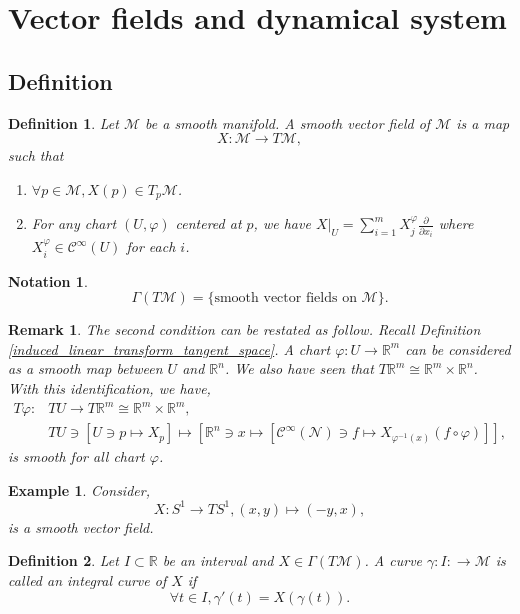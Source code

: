 \documentclass[8pt]{article}
\newtheorem{definition}{Definition}[section]
\newtheorem{notation}{Notation}[section]
\newtheorem{remark}{Remark}[section]
\newtheorem{example}{Example}[section]
\newcommand{\R}[0]{\mathbb{R}}
\newcommand{\M}[0]{\mathcal{M}}
\newcommand{\maniN}[0]{\mathcal{N}}
\newcommand{\cinf}[0]{\mathcal{C}^\infty}
\newcommand{\pd}[2]{{\frac {\partial #1} {\partial #2}}}
\begin{document}
\section{Vector fields and dynamical system}
\subsection{Definition}
\begin{definition}
  Let $\M$ be a smooth manifold. A smooth vector field of $\M$ is a map 
  \begin{equation*}
    X:\M\to T\M,
  \end{equation*}
  such that 
  \begin{enumerate}
    \item $\forall p\in\M, X(p)\in T_p\M$. 
    \item For any chart $(U,\varphi)$ centered at $p$, we have $X|_U=\sum_{i=1}^mX_j^\varphi\pd{}{x_i}$ where $X_i^\varphi\in\cinf(U)$ for each $i$.
  \end{enumerate}
\end{definition}
\begin{notation}
  \begin{equation*}
    \Gamma(T\M) = \{\text{smooth vector fields on $\M$}\}.
  \end{equation*}
\end{notation}
\begin{remark}
  The second condition can be restated as follow. Recall Definition \ref{induced_linear_transform_tangent_space}. A chart $\varphi:U\to \R^m$ can be considered as a smooth map between $U$ and $\R^n$. 
  We also have seen that $T\R^m \cong \R^m\times\R^n$. With this identification, we have,
  \begin{align*}
    T\varphi:&TU\to T\R^m \cong \R^m\times\R^m,\\
    &TU\ni [U\ni p\mapsto X_p]\mapsto [\R^n \ni x \mapsto [\cinf(\maniN)\ni f\mapsto X_{\varphi^{-1}(x)}(f\circ\varphi)]],
  \end{align*}
  is smooth for all chart $\varphi$.
\end{remark}
\begin{example}
  Consider,
  \begin{equation*}
    X:S^1\to TS^1, (x,y)\mapsto (-y,x),
  \end{equation*}
  is a smooth vector field.
\end{example}
\begin{definition}
  Let $I\subset\R$ be an interval and $X\in\Gamma(T\M)$. A curve $\gamma:I:\to\M$ is called an integral curve of $X$ if 
  \begin{equation*}
    \forall t\in I, \gamma'(t) = X(\gamma(t)).
  \end{equation*}
\end{definition}
\end{document}
